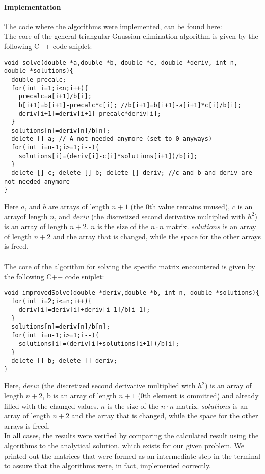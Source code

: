\documentclass[10pt,a4paper]{article}
\begin{document}
\paragraph{Implementation}
The code where the algorithms were implemented, can be found here: \\
The core of the general triangular Gaussian elimination algorithm is given by the following C++ code sniplet:
\begin{lstlisting}[caption=Code for solving the general triangular matrix]
void solve(double *a,double *b, double *c, double *deriv, int n, double *solutions){
  double precalc;
  for(int i=1;i<n;i++){
    precalc=a[i+1]/b[i];
    b[i+1]=b[i+1]-precalc*c[i]; //b[i+1]=b[i+1]-a[i+1]*c[i]/b[i];
    deriv[i+1]=deriv[i+1]-precalc*deriv[i];
  }
  solutions[n]=deriv[n]/b[n];
  delete [] a; // A not needed anymore (set to 0 anyways)
  for(int i=n-1;i>=1;i--){
    solutions[i]=(deriv[i]-c[i]*solutions[i+1])/b[i];
  }
  delete [] c; delete [] b; delete [] deriv; //c and b and deriv are not needed anymore
}
\end{lstlisting}
Here $a$, and $b$ are arrays of length $n+1$ (the 0th value remains unused), $c$ is an arrayof length $n$, and $deriv$ (the discretized second derivative multiplied with $h^2$) is an array of length $n+2$. $n$ is the size of the $ n\cdot n$ matrix. $solutions$ is an array of length $n+2$ and the array that is changed, while the space for the other arrays is freed.\\\\
The core of the algorithm for solving the specific matrix encountered is given by the following C++ code sniplet:
\begin{lstlisting}[caption=Code for solving the specific triangular matrix]
void improvedSolve(double *deriv,double *b, int n, double *solutions){
  for(int i=2;i<=n;i++){
    deriv[i]=deriv[i]+deriv[i-1]/b[i-1];
  }
  solutions[n]=deriv[n]/b[n];
  for(int i=n-1;i>=1;i--){
    solutions[i]=(deriv[i]+solutions[i+1])/b[i];
  }
  delete [] b; delete [] deriv;
}
\end{lstlisting}
Here, $deriv$ (the discretized second derivative multiplied with $h^2$) is an array of length $n+2$, b is an array of length $n+1$ (0th element is ommitted) and already filled with the changed values.  $n$ is the size of the $n\cdot n$ matrix. $solutions$ is an array of length $n+2$ and the array that is changed, while the space for the other arrays is freed.\\
In all cases, the results were verified by comparing the calculated result using the algorithms to the analytical solution, which exists for our given problem. We printed out the matrices that were formed as an intermediate step in the terminal to assure that the algorithms were, in fact, implemented correctly. 
\end{document}
